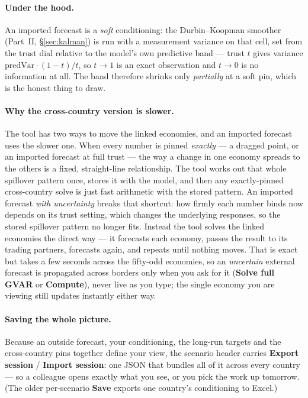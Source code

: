 \documentclass[11pt]{article}
\theoremstyle{definition}
\theoremstyle{remark}
\begin{document}
\paragraph{Under the hood.} An imported forecast is a \emph{soft} conditioning: the
Durbin--Koopman smoother (Part~II, \S\ref{sec:kalman}) is run with a measurement variance on
that cell, set from the trust dial relative to the model's own predictive band --- trust
$t$ gives variance $\mathrm{predVar}\cdot(1-t)/t$, so $t\to1$ is an exact observation and
$t\to0$ is no information at all. The band therefore shrinks only \emph{partially} at a soft
pin, which is the honest thing to draw.

\paragraph{Why the cross-country version is slower.} The tool has two ways to move the linked
economies, and an imported forecast uses the slower one. When every number is pinned
\emph{exactly} --- a dragged point, or an imported forecast at full trust --- the way a change
in one economy spreads to the others is a fixed, straight-line relationship. The tool works out
that whole spillover pattern once, stores it with the model, and then any exactly-pinned
cross-country solve is just fast arithmetic with the stored pattern. An imported forecast
\emph{with uncertainty} breaks that shortcut: how firmly each number binds now depends on its
trust setting, which changes the underlying responses, so the stored spillover pattern no longer
fits. Instead the tool solves the linked economies the direct way --- it forecasts each economy,
passes the result to its trading partners, forecasts again, and repeats until nothing moves. That
is exact but takes a few seconds across the fifty-odd economies, so an \emph{uncertain} external
forecast is propagated across borders only when you ask for it (\textbf{Solve full GVAR} or
\textbf{Compute}), never live as you type; the single economy you are viewing still updates
instantly either way.

\paragraph{Saving the whole picture.} Because an outside forecast, your conditioning, the
long-run targets and the cross-country pins together define your view, the scenario header
carries \textbf{Export session} / \textbf{Import session}: one JSON that bundles all of it
across every country --- so a colleague opens exactly what you see, or you pick the work up
tomorrow. (The older per-scenario \textbf{Save} exports one country's conditioning to Excel.)
\end{document}
